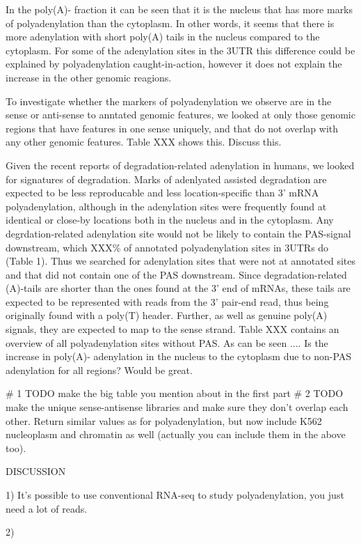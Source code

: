 \documentclass[a4paper]{article}
\begin{document}
In the poly(A)- fraction it can be seen that it is the nucleus that has more
marks of polyadenylation than the cytoplasm. In other words, it seems that
there is more adenylation with short poly(A) tails in the nucleus compared to
the cytoplasm. For some of the adenylation sites in the 3UTR this difference
could be explained by polyadenylation caught-in-action, however it does not
explain the increase in the other genomic reagions.

To investigate whether the markers of polyadenylation we observe are in the
sense or anti-sense to anntated genomic features, we looked at only those
genomic regions that have features in one sense uniquely, and that do not
overlap with any other genomic features. Table XXX shows this. Discuss this.

Given the recent reports of degradation-related adenylation in humans, we
looked for signatures of degradation. Marks of adenlyated assisted degradation
are expected to be less reproducable and less location-specific than 3' mRNA
polyadenylation, although in \cite{} the adenylation sites were frequently
found at identical or close-by locations both in the nucleus and in the
cytoplasm. Any degrdation-related adenylation site would not be likely to
contain the PAS-signal downstream, which XXX\% of annotated polyadenylation
sites in 3UTRs do (Table 1). Thus we searched for adenylation sites that were
not at annotated sites and that did not contain one of the PAS downstream.
Since degradation-related (A)-tails are shorter than the ones found at the 3'
end of mRNAs, these tails are expected to be represented with reads from the 3'
pair-end read, thus being originally found with a poly(T) header. Further, as
well as genuine poly(A) signals, they are expected to map to the sense strand.
Table XXX contains an overview of all polyadenylation sites without PAS. As can
be seen $\dots$. Is the increase in poly(A)- adenylation in the nucleus to the
cytoplasm due to non-PAS adenylation for all regions? Would be great.

# 1 TODO make the big table you mention about in the first part
# 2 TODO make the unique sense-antisense libraries and make sure they don't
overlap each other. Return similar values as for polyadenylation, but now
include K562 nucleoplasm and chromatin as well (actually you can include them
in the above too).

DISCUSSION

1) It's possible to use conventional RNA-seq to study polyadenylation, you just
need a lot of reads.

2) 


%

\end{document}
